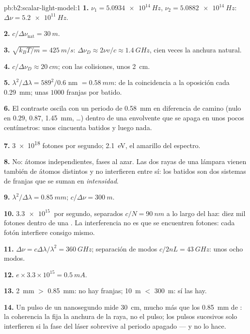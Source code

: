 \begin{solution}{pb:b2:scalar-light-model:1}
\textbf{1.} $\nu_1 = \qty{5.0934e14}{Hz}$, $\nu_2 = \qty{5.0882e14}{Hz}$: $\Delta\nu = \qty{5.2e11}{Hz}$.

\textbf{2.} $c/\Delta\nu_{\text{nat}} = \qty{30}{m}$.

\textbf{3.} $\sqrt{k_BT/m} = \qty{425}{m/s}$: $\Delta\nu_D \approx 2\nu v/c \approx \qty{1.4}{GHz}$, cien
veces la anchura natural.

\textbf{4.} $c/\Delta\nu_D \approx \qty{20}{cm}$; con las colisiones, unos \qty{2}{cm}.

\textbf{5.} $\lambda^2/\Delta\lambda = 589^2/0.6$ nm $= \qty{0.58}{mm}$: de la coincidencia a la
oposición cada \qty{0.29}{mm}; unas $1000$ franjas por batido.

\textbf{6.} El contraste oscila con un periodo de \qty{0.58}{mm} en diferencia
de camino (nulo en $0.29$, $0.87$, \qty{1.45}{mm}, \dots) dentro de una envolvente
que se apaga en unos pocos centímetros: unos cincuenta batidos y luego nada.

\textbf{7.} \qty{3e18}{} fotones por segundo; \qty{2.1}{eV}, el amarillo del
espectro.

\textbf{8.} No: átomos independientes, fases al azar. Las dos rayas de una
lámpara vienen también de átomos distintos y no interfieren entre
sí: los batidos son dos sistemas de franjas que se suman en \emph{intensidad}.

\textbf{9.} $\lambda^2/\Delta\lambda = \qty{0.85}{mm}$; $c/\Delta\nu = \qty{300}{m}$.

\textbf{10.} $\qty{3.3e15}{}$ por segundo, separados $c/N = \qty{90}{nm}$ a lo largo del haz:
diez mil fotones dentro de una . La interferencia no es
que se encuentren fotones: cada fotón interfiere consigo mismo.

\textbf{11.} $\Delta\nu = c\Delta\lambda/\lambda^2 = \qty{360}{GHz}$; separación de modos $c/2nL = \qty{43}{GHz}$:
unos ocho modos.

\textbf{12.} $e \times 3.3 \times 10^{15} = \qty{0.5}{mA}$.

\textbf{13.} \qty{2}{mm} $>$ \qty{0.85}{mm}: no hay franjas; \qty{10}{m} $<$ \qty{300}{m}: sí las hay.

\textbf{14.} Un pulso de un nanosegundo mide \qty{30}{cm}, mucho más que los
\qty{0.85}{mm} de : la coherencia la fija la anchura de la raya, no el pulso;
los pulsos sucesivos solo interfieren si la fase del láser
sobrevive al periodo apagado --- y no lo hace.


\end{solution}
